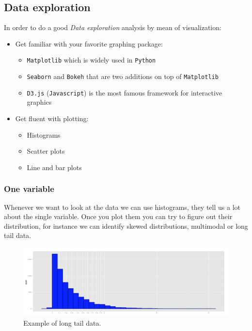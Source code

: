 \subsection{Data exploration}

In order to do a good \emph{Data exploration} analysis by mean of visualization:

\begin{itemize}
\item {Get familiar with your favorite graphing package:}
\begin{itemize}
\item \texttt{Matplotlib} which is widely used in \texttt{Python}
\item \texttt{Seaborn} and \texttt{Bokeh} that are two additions on top of \texttt{Matplotlib}
\item \texttt{D3.js} (\texttt{Javascript}) is the most famous framework for interactive graphics
\end{itemize}
\item {Get fluent with plotting:}
\begin{itemize}
\item Histograms
\item Scatter plots
\item Line and bar plots
\end{itemize}
\end{itemize} 

\subsubsection{One variable}

Whenever we want to look at the data we can use histograms, they tell us a lot about the single variable. Once you plot them you can try to figure out their distribution, for instance we can identify skewed distributions, multimodal or long tail data. 

\begin{figure}[H]%
 \centering
 \includegraphics[width=13cm]{./img/06/long_tail}
 \caption{\label{pic:long_tail} Example of long tail data.}
\end{figure}

